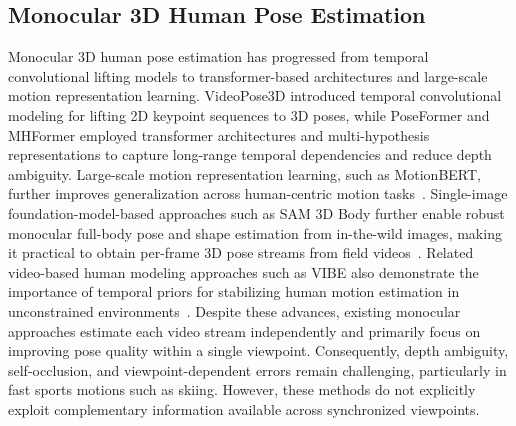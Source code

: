 \documentclass[sigconf,screen]{acmart}
\begin{document}
\subsection{Monocular 3D Human Pose Estimation}
Monocular 3D human pose estimation has progressed from temporal convolutional lifting models to transformer-based architectures and large-scale motion representation learning. VideoPose3D introduced temporal convolutional modeling for lifting 2D keypoint sequences to 3D poses, while PoseFormer and MHFormer employed transformer architectures and multi-hypothesis representations to capture long-range temporal dependencies and reduce depth ambiguity. Large-scale motion representation learning, such as MotionBERT, further improves generalization across human-centric motion tasks~\cite{pavllo2019videopose3d,zheng2021poseformer,li2022mhformer,zhu2023motionbert}. Single-image foundation-model-based approaches such as SAM 3D Body further enable robust monocular full-body pose and shape estimation from in-the-wild images, making it practical to obtain per-frame 3D pose streams from field videos~\cite{yang2026sam}. Related video-based human modeling approaches such as VIBE also demonstrate the importance of temporal priors for stabilizing human motion estimation in unconstrained environments~\cite{kocabas2020vibe}. Despite these advances, existing monocular approaches estimate each video stream independently and primarily focus on improving pose quality within a single viewpoint. Consequently, depth ambiguity, self-occlusion, and viewpoint-dependent errors remain challenging, particularly in fast sports motions such as skiing. However, these methods do not explicitly exploit complementary information available across synchronized viewpoints.

\end{document}
